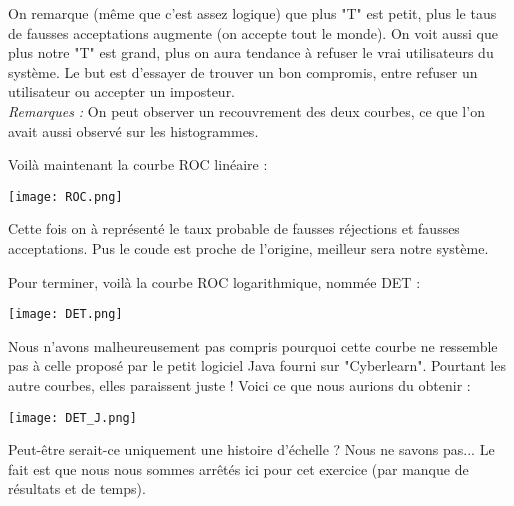 On remarque (même que c'est assez logique) que plus "T" est petit, plus le taus de fausses acceptations augmente (on accepte tout le monde). On voit aussi que plus notre "T" est grand, plus on aura tendance à refuser le vrai utilisateurs du système. Le but est d'essayer de trouver un bon compromis, entre refuser un utilisateur ou accepter un imposteur.\\

\textit{Remarques :} On peut observer un recouvrement des deux courbes, ce que l'on avait aussi observé sur les histogrammes.
\pagebreak


Voilà maintenant la courbe ROC linéaire :

\begin{center} 
\hspace{15cm}
\texttt{[image: ROC.png]}
\end{center}
\vspace{1cm} 

Cette fois on à représenté le taux probable de fausses réjections et fausses acceptations. Pus le coude est proche de l'origine, meilleur sera notre système. 

\pagebreak
Pour terminer, voilà la courbe ROC logarithmique, nommée DET :

\begin{center} 
\hspace{15cm}
\texttt{[image: DET.png]}
\end{center}
\vspace{1cm} 

Nous n'avons malheureusement pas compris pourquoi cette courbe ne ressemble pas à celle proposé par le petit logiciel Java fourni sur "Cyberlearn". Pourtant les autre courbes, elles paraissent juste ! Voici ce  que nous aurions du obtenir :

\begin{center} 
\hspace{15cm}
\texttt{[image: DET\_J.png]}
\end{center}
\vspace{1cm} 

Peut-être serait-ce uniquement une histoire d'échelle ? Nous ne savons pas... Le fait est que nous nous sommes arrêtés ici pour cet exercice (par manque de résultats et de temps). 
